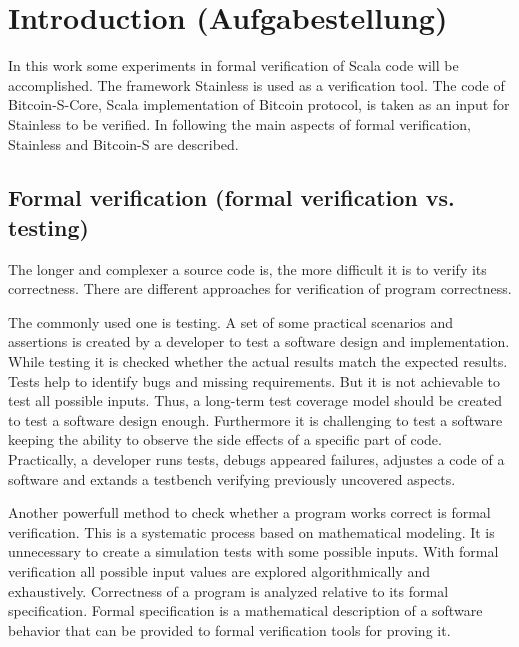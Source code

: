 \chapter{Introduction (Aufgabestellung)}
\label{chap:introduction}

In this work some experiments in formal verification of Scala code will be accomplished. 
The framework Stainless is used as a verification tool. The code of Bitcoin-S-Core, Scala implementation of Bitcoin protocol, is taken as an input for Stainless to be verified. 
In following the main aspects of formal verification, Stainless and Bitcoin-S are described.

\nocite{kopka:band1}
\nocite{raichle:bibtex_programmierung}
\nocite{MiKTeX}
\nocite{KOMA}
\nocite{TeXnicCenter}
\nocite{Marti06}
\nocite{Erbsland08}
\nocite{juergens:einfuehrung}
\nocite{juergens:fortgeschritten}

\section{Formal verification (formal verification vs. testing)}
\label{sec:formal_verification}

The longer and complexer a source code is, the more difficult it is to verify its correctness.
There are different approaches for verification of program correctness. 

The commonly used one is testing. A set of some practical scenarios and assertions is created by a developer to test a software design and implementation. 
While testing it is checked whether the actual results match the expected results. Tests help to identify bugs and missing requirements.
But it is not achievable to test all possible inputs. 
Thus, a long-term test coverage model should be created to test a software design enough.
Furthermore it is challenging to test a software keeping the ability to observe the side effects of a specific part of code.
Practically, a developer runs tests, debugs appeared failures, adjustes a code of a software and extands a testbench verifying previously uncovered aspects. \cite{sanghavi:formal_verification}

Another powerfull method to check whether a program works correct is formal verification. 
This is a systematic process based on mathematical modeling. 
It is unnecessary to create a simulation tests with some possible inputs. 
With formal verification all possible input values are explored algorithmically and exhaustively.
Correctness of a program is analyzed relative to its formal specification.
Formal specification is a mathematical description of a software behavior that can be provided to formal verification tools for proving it. \cite{sanghavi:formal_verification}

